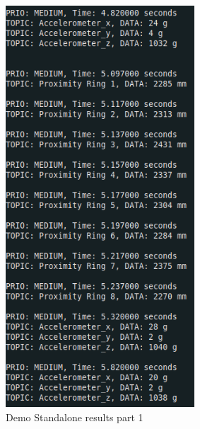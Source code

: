 \documentclass[12pt]{report}%
\begin{document}
\begin{figure}[ht]
	\centering
	\includegraphics[width=\textwidth, height=15cm]{standalone_1}
  	\caption{Demo Standalone results part 1}
  	\label{fig:res1}
\end{figure}
\end{document}
